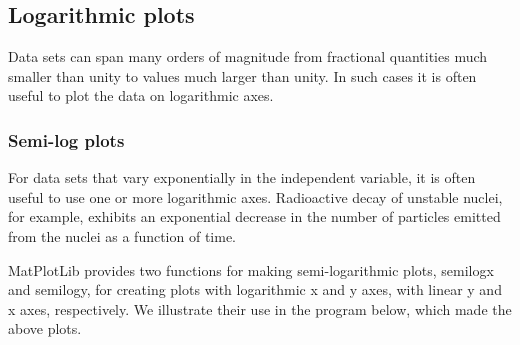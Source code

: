 \documentclass[11pt]{article}
\begin{document}
\hypertarget{logarithmic-plots}{%
\subsection{Logarithmic plots}\label{logarithmic-plots}}

Data sets can span many orders of magnitude from fractional quantities
much smaller than unity to values much larger than unity. In such cases
it is often useful to plot the data on logarithmic axes.

    \hypertarget{semi-log-plots}{%
\subsubsection{Semi-log plots}\label{semi-log-plots}}

For data sets that vary exponentially in the independent variable, it is
often useful to use one or more logarithmic axes. Radioactive decay of
unstable nuclei, for example, exhibits an exponential decrease in the
number of particles emitted from the nuclei as a function of time.

MatPlotLib provides two functions for making semi-logarithmic plots,
semilogx and semilogy, for creating plots with logarithmic x and y axes,
with linear y and x axes, respectively. We illustrate their use in the
program below, which made the above plots.
\end{document}
